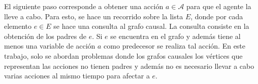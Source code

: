 El siguiente paso corresponde a obtener una acción $a \in \mathcal{A}$ para que el agente la lleve a cabo.
Para esto, se hace un recorrido sobre la lista $E$, donde
por cada elemento $e \in E$ se hace una consulta al grafo causal. La consulta consiste en la
obtención de los padres de $e$.  Si $e$ se encuentra en el grafo y además tiene al menos una variable de acción $a$ como predecesor se realiza tal acción.
En este trabajo, solo se abordan problemas donde los grafos causales los vértices que representan las acciones no tienen padres y además no es necesario llevar a cabo varias acciones al mismo tiempo para afectar a $e$.




